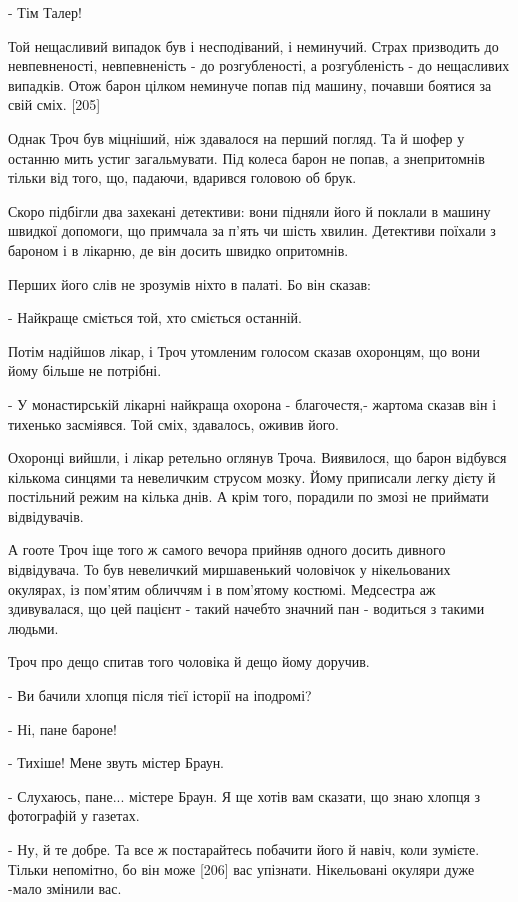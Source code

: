 - Тім Талер!

Той нещасливий випадок був і несподіваний, і неминучий. Страх призводить до невпевненості, невпевненість - до розгубленості, а розгубленість - до нещасливих випадків. Отож барон цілком неминуче попав під машину, почавши боятися за свій сміх. [205]

Однак Троч був міцніший, ніж здавалося на перший погляд. Та й шофер у останню мить устиг загальмувати. Під колеса барон не попав, а знепритомнів тільки від того, що, падаючи, вдарився головою об брук.

Скоро підбігли два захекані детективи: вони підняли його й поклали в машину швидкої допомоги, що примчала за п'ять чи шість хвилин. Детективи поїхали з бароном і в лікарню, де він досить швидко опритомнів.

Перших його слів не зрозумів ніхто в палаті. Бо він сказав:

- Найкраще сміється той, хто сміється останній.

Потім надійшов лікар, і Троч утомленим голосом сказав охоронцям, що вони йому більше не потрібні.

- У монастирській лікарні найкраща охорона - благочестя,- жартома сказав він і тихенько засміявся. Той сміх, здавалось, оживив його.

Охоронці вийшли, і лікар ретельно оглянув Троча. Виявилося, що барон відбувся кількома синцями та невеличким струсом мозку. Йому приписали легку дієту й постільний режим на кілька днів. А крім того, порадили по змозі не приймати відвідувачів.

А гооте Троч іще того ж самого вечора прийняв одного досить дивного відвідувача. То був невеличкий миршавенький чоловічок у нікельованих окулярах, із пом'ятим обличчям і в пом'ятому костюмі. Медсестра аж здивувалася, що цей пацієнт - такий начебто значний пан - водиться з такими людьми.

Троч про дещо спитав того чоловіка й дещо йому доручив.

- Ви бачили хлопця після тієї історії на іподромі?

- Ні, пане бароне!

- Тихіше! Мене звуть містер Браун.

- Слухаюсь, пане... містере Браун. Я ще хотів вам сказати, що знаю хлопця з фотографій у газетах.

- Ну, й те добре. Та все ж постарайтесь побачити його й навіч, коли зумієте. Тільки непомітно, бо він може [206] вас упізнати. Нікельовані окуляри дуже -мало змінили вас.

